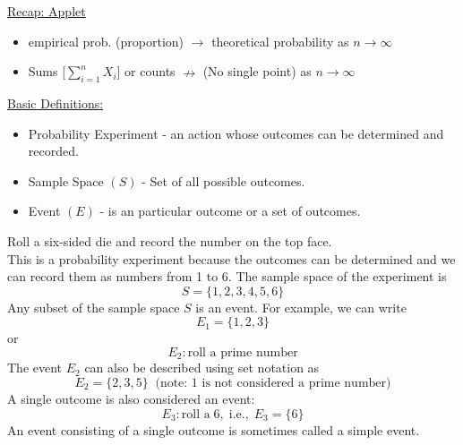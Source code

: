 \documentclass[handout]{ximera}
\newcommand {\bi} {\begin{itemize}}
\newcommand {\ei} {\end{itemize}}
\begin{document}
 \item \underline{Recap: Applet}
     \bi
      \item[]  empirical prob. (proportion) $\rightarrow$ theoretical probability as $n \rightarrow \infty$
      \item[]  Sums [$\sum_{i=1}^n X_i$] or counts $\nrightarrow$ (No single point) as $n \rightarrow \infty$
     \ei

 \item \underline{Basic Definitions:}

   \bi
	  \item Probability Experiment - an action whose outcomes can be determined and recorded.
    \item Sample Space $(S)$ - Set of all possible outcomes.
    \item Event $(E)$ - is an particular outcome or a set of outcomes.
   \ei
	
	\begin{example}
	Roll a six-sided die and record the number on the top face.\\
	This is a probability experiment because the outcomes can be determined and we can 
	record them as numbers from 1 to 6.
	The sample space of the experiment is 
	\[
	S = \{ 1, 2, 3, 4, 5, 6\}
	\]
	Any subset of the sample space $S$ is an event. For example, we can write
	\[
	E_1 = \{1, 2, 3\}
	\]
	or
	\[
	E_2: \mbox{roll a prime number}
	\]
	The event $E_2$ can also be described using set notation as
	\[
	E_2 = \{2, 3, 5\} \;\; \mbox{(note: 1 is not considered a prime number)}
	\]
	A single outcome is also considered an event:
	\[
	E_3: \mbox{roll a} \; 6, \;\mbox{i.e.}, \; E_3 = \{6\}
	\]
	An event consisting of a single outcome is sometimes called a simple event.
	
	\end{example}
	
\end{document}
